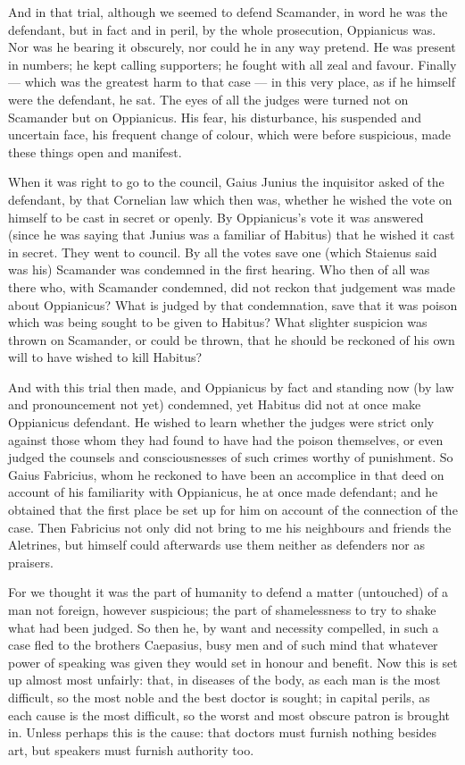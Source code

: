  And in that trial, although we seemed to defend Scamander, in word he was the defendant, but in fact and in peril, by the whole prosecution, Oppianicus was. Nor was he bearing it obscurely, nor could he in any way pretend. He was present in numbers; he kept calling supporters; he fought with all zeal and favour. Finally --- which was the greatest harm to that case --- in this very place, as if he himself were the defendant, he sat. The eyes of all the judges were turned not on Scamander but on Oppianicus. His fear, his disturbance, his suspended and uncertain face, his frequent change of colour, which were before suspicious, made these things open and manifest.

 When it was right to go to the council, Gaius Junius the inquisitor asked of the defendant, by that Cornelian law which then was, whether he wished the vote on himself to be cast in secret or openly. By Oppianicus's vote it was answered (since he was saying that Junius was a familiar of Habitus) that he wished it cast in secret. They went to council. By all the votes save one (which Staienus said was his) Scamander was condemned in the first hearing. Who then of all was there who, with Scamander condemned, did not reckon that judgement was made about Oppianicus? What is judged by that condemnation, save that it was poison which was being sought to be given to Habitus? What slighter suspicion was thrown on Scamander, or could be thrown, that he should be reckoned of his own will to have wished to kill Habitus?

 And with this trial then made, and Oppianicus by fact and standing now (by law and pronouncement not yet) condemned, yet Habitus did not at once make Oppianicus defendant. He wished to learn whether the judges were strict only against those whom they had found to have had the poison themselves, or even judged the counsels and consciousnesses of such crimes worthy of punishment. So Gaius Fabricius, whom he reckoned to have been an accomplice in that deed on account of his familiarity with Oppianicus, he at once made defendant; and he obtained that the first place be set up for him on account of the connection of the case. Then Fabricius not only did not bring to me his neighbours and friends the Aletrines, but himself could afterwards use them neither as defenders nor as praisers.

 For we thought it was the part of humanity to defend a matter (untouched) of a man not foreign, however suspicious; the part of shamelessness to try to shake what had been judged. So then he, by want and necessity compelled, in such a case fled to the brothers Caepasius, busy men and of such mind that whatever power of speaking was given they would set in honour and benefit. Now this is set up almost most unfairly: that, in diseases of the body, as each man is the most difficult, so the most noble and the best doctor is sought; in capital perils, as each cause is the most difficult, so the worst and most obscure patron is brought in. Unless perhaps this is the cause: that doctors must furnish nothing besides art, but speakers must furnish authority too.

